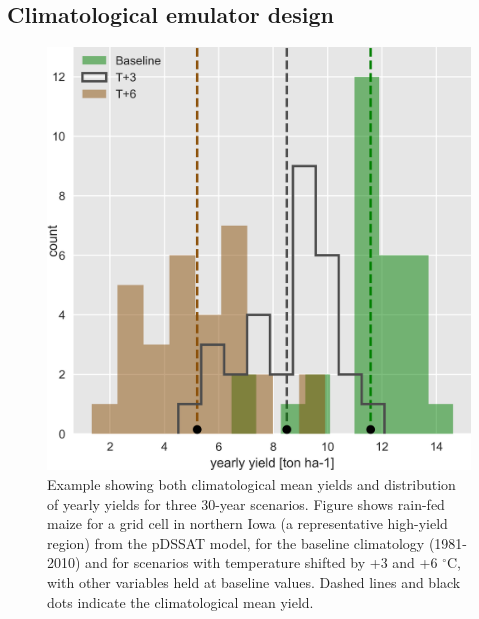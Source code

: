 \documentclass[preprint, 5p, times, twocolumn]{elsarticle}
\begin{document}
\subsection{Climatological emulator design}
\begin{figure}[!h]
\centering
   \includegraphics[width=0.95\linewidth]{hist_year.png}
   \caption{Example showing both climatological mean yields and distribution of yearly yields for three 30-year scenarios. Figure shows rain-fed maize for a grid cell in northern Iowa (a representative high-yield region) from the pDSSAT model, for the baseline climatology (1981-2010) and for scenarios with temperature shifted by +3 and +6 $^{\circ}$C, with other variables held at baseline values. Dashed lines and black dots indicate the climatological mean yield.}
   \label{fig:yearly}
\end{figure}
\end{document}
